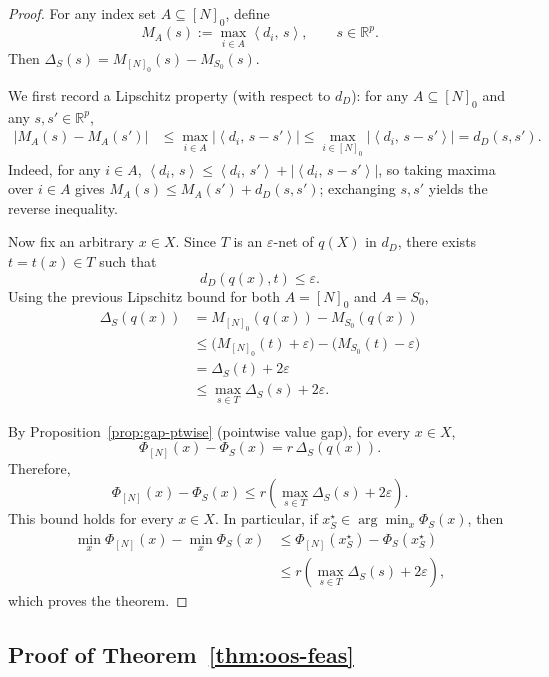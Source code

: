 \documentclass[accepted]{uai2026}
\theoremstyle{plain}
\theoremstyle{definition}
\theoremstyle{remark}
\newcommand{\R}{\mathbb{R}}
\newcommand{\ip}[2]{\left\langle #1 ,\, #2 \right\rangle}
\begin{document}
\begin{proof}
For any index set $A\subseteq [N]_0$, define
\[
M_A(s) := \max_{i\in A}\ip{d_i}{s}, \qquad s\in\R^p.
\]
Then $\Delta_S(s)=M_{[N]_0}(s)-M_{S_0}(s)$.

We first record a Lipschitz property (with respect to $d_D$): for any $A\subseteq [N]_0$ and any $s,s'\in\R^p$,
\begin{align*}
|M_A(s)-M_A(s')|
&\le \max_{i\in A}\left|\ip{d_i}{s-s'}\right|
\le \max_{i\in [N]_0}\left|\ip{d_i}{s-s'}\right|
= d_D(s,s').
\end{align*}
Indeed, for any $i\in A$, $\ip{d_i}{s}\le \ip{d_i}{s'}+| \ip{d_i}{s-s'}|$, so taking maxima over $i\in A$ gives
$M_A(s)\le M_A(s')+d_D(s,s')$; exchanging $s,s'$ yields the reverse inequality.

Now fix an arbitrary $x\in X$. Since $T$ is an $\varepsilon$-net of $q(X)$ in $d_D$, there exists $t=t(x)\in T$ such that
\[
d_D(q(x),t)\le \varepsilon.
\]
Using the previous Lipschitz bound for both $A=[N]_0$ and $A=S_0$,
\begin{align*}
\Delta_S(q(x))
&= M_{[N]_0}(q(x)) - M_{S_0}(q(x))\\
&\le \bigl(M_{[N]_0}(t)+\varepsilon\bigr) - \bigl(M_{S_0}(t)-\varepsilon\bigr)\\
&= \Delta_S(t)+2\varepsilon\\
&\le \max_{s\in T}\Delta_S(s)+2\varepsilon.
\end{align*}

By Proposition~\ref{prop:gap-ptwise} (pointwise value gap), for every $x\in X$,
\[
\Phi_{[N]}(x)-\Phi_S(x) = r\,\Delta_S(q(x)).
\]
Therefore,
\[
\Phi_{[N]}(x)-\Phi_S(x)
\le
r\left(\max_{s\in T}\Delta_S(s)+2\varepsilon\right).
\]
This bound holds for every $x\in X$. In particular, if $x_S^\star\in\arg\min_x\Phi_S(x)$, then
\begin{align*}
\min_x \Phi_{[N]}(x)-\min_x \Phi_S(x)
&\le \Phi_{[N]}(x_S^\star)-\Phi_S(x_S^\star)\\
&\le r\left(\max_{s\in T}\Delta_S(s)+2\varepsilon\right),
\end{align*}
which proves the theorem.
\end{proof}

\subsection{Proof of Theorem~\ref{thm:oos-feas}}
\label{app:oos-proof}
\end{document}
